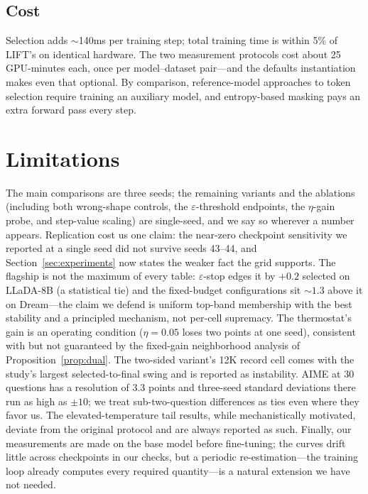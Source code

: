 \documentclass{article} %
\begin{document}
\subsection{Cost}

Selection adds $\sim$140ms per training step; total training time is within 5\% of LIFT's on identical hardware. The two measurement protocols cost about 25 GPU-minutes each, once per model--dataset pair---and the defaults instantiation makes even that optional. By comparison, reference-model approaches to token selection require training an auxiliary model, and entropy-based masking pays an extra forward pass every step.

\section{Limitations}

The main comparisons are three seeds; the remaining variants and the ablations (including both wrong-shape controls, the $\varepsilon$-threshold endpoints, the $\eta$-gain probe, and step-value scaling) are single-seed, and we say so wherever a number appears. Replication cost us one claim: the near-zero checkpoint sensitivity we reported at a single seed did not survive seeds 43--44, and Section~\ref{sec:experiments} now states the weaker fact the grid supports. The flagship is not the maximum of every table: $\varepsilon$-stop edges it by $+0.2$ selected on LLaDA-8B (a statistical tie) and the fixed-budget configurations sit $\sim$$1.3$ above it on Dream---the claim we defend is uniform top-band membership with the best stability and a principled mechanism, not per-cell supremacy. The thermostat's gain is an operating condition ($\eta = 0.05$ loses two points at one seed), consistent with but not guaranteed by the fixed-gain neighborhood analysis of Proposition~\ref{prop:dual}. The two-sided variant's 12K record cell comes with the study's largest selected-to-final swing and is reported as instability. AIME at 30 questions has a resolution of 3.3 points and three-seed standard deviations there run as high as $\pm 10$; we treat sub-two-question differences as ties even where they favor us. The elevated-temperature tail results, while mechanistically motivated, deviate from the original protocol and are always reported as such. Finally, our measurements are made on the base model before fine-tuning; the curves drift little across checkpoints in our checks, but a periodic re-estimation---the training loop already computes every required quantity---is a natural extension we have not needed.
\end{document}
